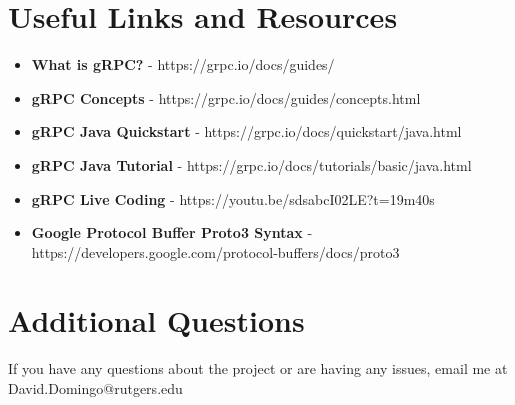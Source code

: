 \documentclass{article}
\newenvironment{file}[1][File]{ %
	\medskip
	\newcommand{\mdfilename}{#1}
	\begin{mdframed}[style=file]
}{
	\end{mdframed}
	\medskip
}
\newcounter{Question} %
\begin{document}
\section{Useful Links and Resources} %
\begin{itemize}
\item \textbf{What is gRPC?} - https://grpc.io/docs/guides/
\item \textbf{gRPC Concepts} - https://grpc.io/docs/guides/concepts.html
\item \textbf{gRPC Java Quickstart} - https://grpc.io/docs/quickstart/java.html
\item \textbf{gRPC Java Tutorial} - https://grpc.io/docs/tutorials/basic/java.html
\item \textbf{gRPC Live Coding} - https://youtu.be/sdsabcI02LE?t=19m40s 
\item \textbf{Google Protocol Buffer Proto3 Syntax} - https://developers.google.com/protocol-buffers/docs/proto3
\end{itemize}



\section{Additional Questions} %
If you have any questions about the project or are having any issues, email me at David.Domingo@rutgers.edu


%
\end{document}
